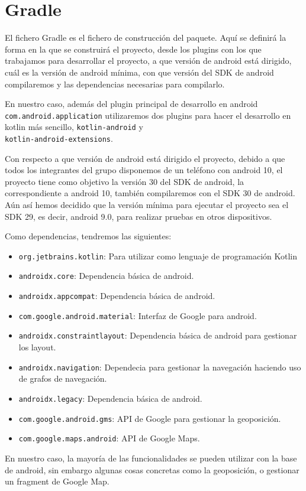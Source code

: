 \section{Gradle}

El fichero Gradle\cite{gradle} es el fichero de construcción del paquete. Aquí se definirá la forma en la que se construirá el proyecto, desde los plugins con los que trabajamos para desarrollar el proyecto, a que versión de android está dirigido, cuál es la versión de android mínima, con que versión del SDK de android compilaremos y las dependencias necesarias para compilarlo.


En nuestro caso, además del plugin principal de desarrollo en android \texttt{com.android.application} utilizaremos dos plugins para hacer el desarrollo en kotlin más sencillo, \texttt{kotlin-android}\cite{kotlinAndroid} y \\ \texttt{kotlin-android-extensions}.

Con respecto a que versión de android está dirigido el proyecto, debido a que todos los integrantes del grupo disponemos de un teléfono con android 10, el proyecto tiene como objetivo la versión 30 del SDK de android, la correspondiente a android 10, también compilaremos con el SDK 30 de android. Aún así hemos decidido que la versión mínima para ejecutar el proyecto sea el SDK 29, es decir, android 9.0, para realizar pruebas en otros dispositivos.



Como dependencias, tendremos las siguientes:

\begin{itemize}
	\item \texttt{org.jetbrains.kotlin}: Para utilizar como lenguaje de programación Kotlin
	\item \texttt{androidx.core}: Dependencia básica de android.
	\item \texttt{androidx.appcompat}: Dependencia básica de android.
	\item \texttt{com.google.android.material}: Interfaz de Google para android.
	\item \texttt{androidx.constraintlayout}: Dependencia básica de android para gestionar los layout.
	\item \texttt{androidx.navigation}: Dependecia para gestionar la navegación haciendo uso de grafos de navegación.
	\item \texttt{androidx.legacy}: Dependencia básica de android.
	\item \texttt{com.google.android.gms}: API de Google para gestionar la geoposición.
	\item \texttt{com.google.maps.android}: API de Google Maps.
\end{itemize}


En nuestro caso, la mayoría de las funcionalidades se pueden utilizar con la base de android, sin embargo algunas cosas concretas como la geoposición, o gestionar un fragment de Google Map.


